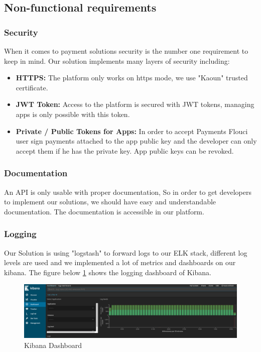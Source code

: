 \begin{spacing}{1.2}
\subsection{Non-functional requirements}
\subsubsection{Security}
When it comes to payment solutions security is the number one requirement to keep in mind.
Our solution implements many layers of security including: 
\begin{itemize}
	\item \textbf{HTTPS:} The platform only works on https mode, we use "Kaoun" trusted certificate.
	\item \textbf{JWT Token\cite{JWT}:}  Access to the platform is secured with JWT tokens, managing apps is only possible with this token.
	\item \textbf{Private / Public Tokens for Apps:}  In order to accept Payments Flouci user sign payments attached to the app public key and the developer can only accept them if he has the private key.
	App public keys can be revoked.
\end{itemize}
\subsubsection{Documentation}
An API is only usable with proper documentation, So in order to get developers to implement our solutions, we should have easy and understandable documentation. The documentation is accessible in our platform.\subsubsection{Logging}
Our Solution is using "logstash" to forward logs to our ELK\cite{ELK} stack, different log levels are used and we implemented a lot of metrics and dashboards on our kibana.
The figure below \ref{fig:kibana} shows the logging dashboard of Kibana.
\begin{figure}[H]\centering
\includegraphics[scale=0.3]{ELK.png}
\caption{Kibana Dashboard}
\label{fig:kibana}
\end{figure}


\end{spacing}

